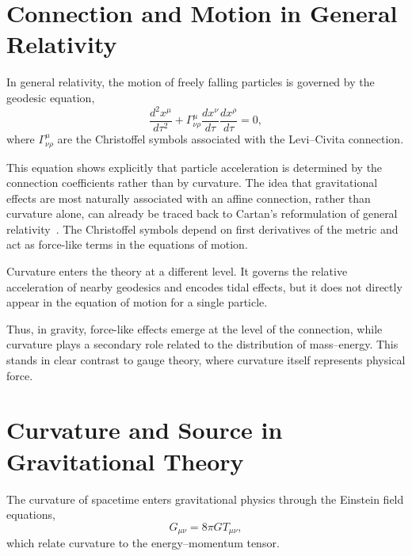 \documentclass[12pt,letterpaper]{article}
\begin{document}
\section{Connection and Motion in General Relativity}

\justifying
In general relativity, the motion of freely falling particles is governed by the geodesic equation,
\begin{equation}
\frac{d^2 x^\mu}{d\tau^2} + \Gamma^\mu_{\nu\rho} \frac{dx^\nu}{d\tau} \frac{dx^\rho}{d\tau} = 0,
\end{equation}
where $\Gamma^\mu_{\nu\rho}$ are the Christoffel symbols associated with the Levi--Civita connection.

This equation shows explicitly that particle acceleration is determined by the connection coefficients rather than by curvature.
The idea that gravitational effects are most naturally associated with an affine connection, rather than curvature alone, can already be traced back to Cartan's reformulation of general relativity~\cite{Cartan}. The Christoffel symbols depend on first derivatives of the metric and act as force-like terms in the equations of motion.

Curvature enters the theory at a different level. It governs the relative acceleration of nearby geodesics and encodes tidal effects, but it does not directly appear in the equation of motion for a single particle.

Thus, in gravity, force-like effects emerge at the level of the connection, while curvature plays a secondary role related to the distribution of mass--energy. This stands in clear contrast to gauge theory, where curvature itself represents physical force.


\section{Curvature and Source in Gravitational Theory}

\justifying
The curvature of spacetime enters gravitational physics through the Einstein field equations,
\begin{equation}
G_{\mu\nu} = 8\pi G T_{\mu\nu},
\end{equation}
which relate curvature to the energy--momentum tensor.
\end{document}
